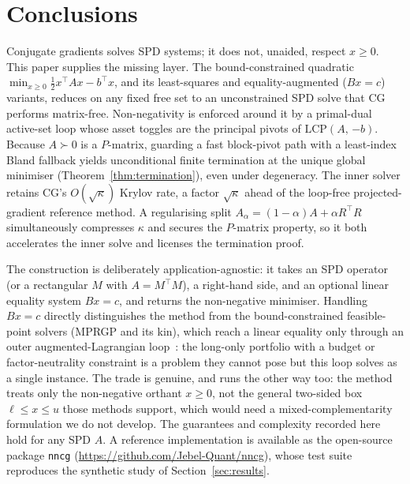 \section{Conclusions}

Conjugate gradients solves SPD systems; it does not, unaided, respect $x \geq 0$. This paper
supplies the missing layer. The bound-constrained quadratic $\min_{x\geq0}
\tfrac{1}{2}x^\top A x - b^\top x$, and its least-squares and equality-augmented ($Bx = c$)
variants, reduces on any fixed free set to an unconstrained SPD solve that CG performs
matrix-free. Non-negativity is enforced around it by a primal-dual active-set loop whose asset
toggles are the principal pivots of $\mathrm{LCP}(A,\,{-b})$. Because $A \succ 0$ is a
$P$-matrix, guarding a fast block-pivot path with a least-index Bland fallback yields
unconditional finite termination at the unique global minimiser (Theorem~\ref{thm:termination}),
even under degeneracy. The inner solver retains CG's $O(\sqrt\kappa)$ Krylov rate,
a factor $\sqrt\kappa$ ahead of the loop-free projected-gradient reference method. A
regularising split $A_\alpha = (1-\alpha)A + \alpha R^\top R$ simultaneously compresses
$\kappa$ and secures the $P$-matrix property, so it both accelerates the inner solve and
licenses the termination proof.

The construction is deliberately application-agnostic: it takes an SPD operator (or a
rectangular $M$ with $A = M^\top M$), a right-hand side, and an optional linear equality
system $Bx = c$, and returns the non-negative minimiser. Handling $Bx = c$ directly
distinguishes the method from the bound-constrained feasible-point solvers (MPRGP and its kin),
which reach a linear equality only through an outer augmented-Lagrangian
loop~\cite{dostal2006smalbe}: the long-only portfolio with a budget or factor-neutrality
constraint is a problem they cannot pose but this loop solves as a single instance. The trade
is genuine, and runs the other way too: the method treats only the non-negative orthant
$x \geq 0$, not the general two-sided box $\ell \leq x \leq u$ those methods support, which
would need a mixed-complementarity formulation we do not develop. The guarantees and complexity
recorded here hold for any SPD $A$. A reference implementation is available as the open-source package \texttt{nncg}
(\url{https://github.com/Jebel-Quant/nncg}), whose test suite reproduces the synthetic study
of Section~\ref{sec:results}.
